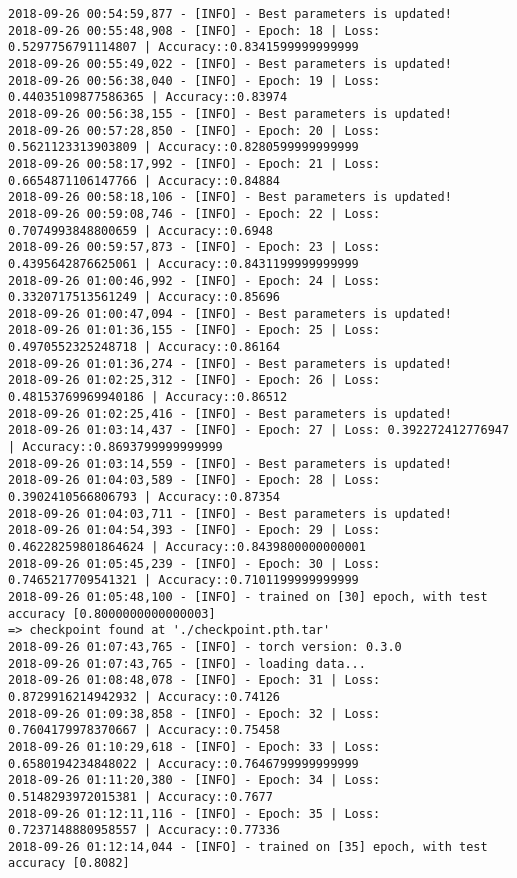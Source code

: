 \documentclass[11pt]{article}
\begin{document}
\begin{verbatim}
2018-09-26 00:54:59,877 - [INFO] - Best parameters is updated!
2018-09-26 00:55:48,908 - [INFO] - Epoch: 18 | Loss: 0.5297756791114807 | Accuracy::0.8341599999999999
2018-09-26 00:55:49,022 - [INFO] - Best parameters is updated!
2018-09-26 00:56:38,040 - [INFO] - Epoch: 19 | Loss: 0.44035109877586365 | Accuracy::0.83974
2018-09-26 00:56:38,155 - [INFO] - Best parameters is updated!
2018-09-26 00:57:28,850 - [INFO] - Epoch: 20 | Loss: 0.5621123313903809 | Accuracy::0.8280599999999999
2018-09-26 00:58:17,992 - [INFO] - Epoch: 21 | Loss: 0.6654871106147766 | Accuracy::0.84884
2018-09-26 00:58:18,106 - [INFO] - Best parameters is updated!
2018-09-26 00:59:08,746 - [INFO] - Epoch: 22 | Loss: 0.7074993848800659 | Accuracy::0.6948
2018-09-26 00:59:57,873 - [INFO] - Epoch: 23 | Loss: 0.4395642876625061 | Accuracy::0.8431199999999999
2018-09-26 01:00:46,992 - [INFO] - Epoch: 24 | Loss: 0.3320717513561249 | Accuracy::0.85696
2018-09-26 01:00:47,094 - [INFO] - Best parameters is updated!
2018-09-26 01:01:36,155 - [INFO] - Epoch: 25 | Loss: 0.4970552325248718 | Accuracy::0.86164
2018-09-26 01:01:36,274 - [INFO] - Best parameters is updated!
2018-09-26 01:02:25,312 - [INFO] - Epoch: 26 | Loss: 0.48153769969940186 | Accuracy::0.86512
2018-09-26 01:02:25,416 - [INFO] - Best parameters is updated!
2018-09-26 01:03:14,437 - [INFO] - Epoch: 27 | Loss: 0.392272412776947 | Accuracy::0.8693799999999999
2018-09-26 01:03:14,559 - [INFO] - Best parameters is updated!
2018-09-26 01:04:03,589 - [INFO] - Epoch: 28 | Loss: 0.3902410566806793 | Accuracy::0.87354
2018-09-26 01:04:03,711 - [INFO] - Best parameters is updated!
2018-09-26 01:04:54,393 - [INFO] - Epoch: 29 | Loss: 0.46228259801864624 | Accuracy::0.8439800000000001
2018-09-26 01:05:45,239 - [INFO] - Epoch: 30 | Loss: 0.7465217709541321 | Accuracy::0.7101199999999999
2018-09-26 01:05:48,100 - [INFO] - trained on [30] epoch, with test accuracy [0.8000000000000003]
=> checkpoint found at './checkpoint.pth.tar'
2018-09-26 01:07:43,765 - [INFO] - torch version: 0.3.0
2018-09-26 01:07:43,765 - [INFO] - loading data...
2018-09-26 01:08:48,078 - [INFO] - Epoch: 31 | Loss: 0.8729916214942932 | Accuracy::0.74126
2018-09-26 01:09:38,858 - [INFO] - Epoch: 32 | Loss: 0.7604179978370667 | Accuracy::0.75458
2018-09-26 01:10:29,618 - [INFO] - Epoch: 33 | Loss: 0.6580194234848022 | Accuracy::0.7646799999999999
2018-09-26 01:11:20,380 - [INFO] - Epoch: 34 | Loss: 0.5148293972015381 | Accuracy::0.7677
2018-09-26 01:12:11,116 - [INFO] - Epoch: 35 | Loss: 0.7237148880958557 | Accuracy::0.77336
2018-09-26 01:12:14,044 - [INFO] - trained on [35] epoch, with test accuracy [0.8082]

\end{verbatim}
\end{document}
